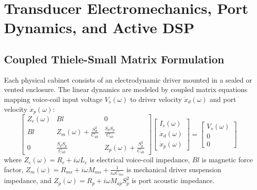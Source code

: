 \documentclass[11pt,a4paper,titlepage]{article}
\begin{document}
\newpage

\section{Transducer Electromechanics, Port Dynamics, and Active DSP}
\label{app:transducer}

\subsection{Coupled Thiele-Small Matrix Formulation}
Each physical cabinet consists of an electrodynamic driver mounted in a sealed or vented enclosure. The linear dynamics are modeled by coupled matrix equations mapping voice-coil input voltage $V_s(\omega)$ to driver velocity $\dot{x}_d(\omega)$ and port velocity $\dot{x}_p(\omega)$:
\begin{equation}
    \begin{bmatrix}
        Z_e(\omega) & B l & 0 \\
        B l & Z_m(\omega) + \frac{S_d^2}{C_{ab}} & \frac{S_d S_p}{C_{ab}} \\
        0 & \frac{S_d S_p}{C_{ab}} & Z_p(\omega) + \frac{S_p^2}{C_{ab}}
    \end{bmatrix}
    \begin{bmatrix}
        I_s(\omega) \\
        \dot{x}_d(\omega) \\
        \dot{x}_p(\omega)
    \end{bmatrix}
    =
    \begin{bmatrix}
        V_s(\omega) \\
        0 \\
        0
    \end{bmatrix}
\end{equation}
where $Z_e(\omega) = R_e + i \omega L_e$ is electrical voice-coil impedance, $B l$ is magnetic force factor, $Z_m(\omega) = R_{ms} + i \omega M_{ms} + \frac{1}{i \omega C_{ms}}$ is mechanical driver suspension impedance, and $Z_p(\omega) = R_p + i \omega M_{ap} S_p^2$ is port acoustic impedance.
\end{document}
